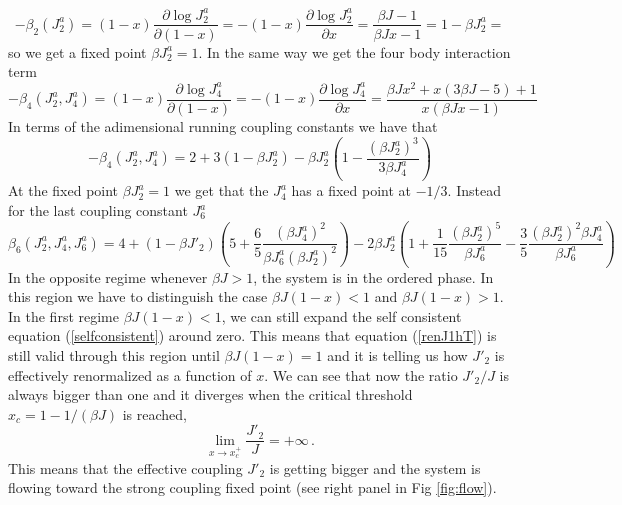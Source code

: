 \documentclass[aps,pre,noshowpacs]{revtex4}
\begin{document}
\begin{equation}
-\beta_2(J^a_2) = (1-x) \frac{\partial \log J^a_2}{\partial (1-x)} =-(1-x) \frac{\partial \log J^a_2}{\partial x} = \frac{\beta J -1}{\beta J x -1} = 1-\beta J^a_2 =
\end{equation}
so we get a fixed point $\beta J^a_2=1$. In the same way we get the four body interaction term
\begin{equation}
-\beta_4(J^a_2, J^a_4) = (1-x) \frac{\partial \log J^a_4}{\partial (1-x)} =-(1-x) \frac{\partial \log J^a_4}{\partial x} = \frac{\beta  J x^2+x (3 \beta  J-5)+1}{x (\beta  J x-1)}
\end{equation}
In terms of the adimensional running coupling constants we have that 
\begin{equation}
-\beta_4(J^a_2, J^a_4)  =   2 + 3(1-\beta J^a_2) - \beta J^a_2\left(1-\frac{(\beta J^a_2)^3}{3\beta J^a_4} \right)
\end{equation}
At the fixed point $\beta J^a_2=1$ we get that the $J^a_4$ has a fixed point at $-1/3$. 
Instead for the last coupling constant $J^a_6$ 
\begin{equation}
\beta_6(J^a_2, J^a_4,J^a_6) = 4+ (1-\beta J'_2) \left(5 + \frac{6}{5} \frac{(\beta J^a_4)^2}{\beta J^a_6 (\beta J^a_2)^2}\right)- 2\beta J^a_2 \left( 1+ \frac{1}{15} \frac{(\beta J^a_2)^5}{ \beta J^a_6} - \frac{3}{5}  \frac{(\beta J^a_2)^2 \beta J^a_4}{\beta J^a_6}\right) 
\end{equation}
In the opposite regime whenever $\beta J>1$, the system is in the ordered phase. In this region we have to distinguish the case $\beta J(1-x)<1$ and $\beta J(1-x)>1$.
In the first regime $\beta J(1-x)<1$, we can still expand the self consistent equation (\ref{selfconsistent}) around zero. This means that equation (\ref{renJ1hT}) is still valid through this region until $\beta J(1-x)=1$ and it is telling us how $J'_2$ is effectively renormalized as a function of $x$. We can see that now the ratio $J'_2/J$ is always bigger than one and it diverges when the critical threshold $x_c=1-1/(\beta J)$ is reached, $$\lim_{ x\to x_c^+} \frac{J'_2}{J}=+\infty\,.$$ This means that the effective coupling $J'_2$ is getting bigger and the system is flowing toward the strong coupling fixed point (see right panel in Fig \ref{fig:flow}). 
\end{document}
